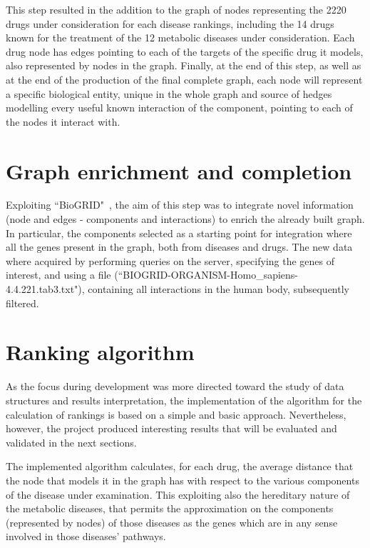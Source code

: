 This step resulted in the addition to the graph of nodes representing the 2220 drugs under consideration for each disease rankings, including the 14 drugs known for the treatment of the 12 metabolic diseases under consideration.
Each drug node has edges pointing to each of the targets of the specific drug it models, also represented by nodes in the graph. Finally, at the end of this step, as well as at the end of the production of the final complete graph, each node will represent a specific biological entity, unique in the whole graph and source of hedges modelling every useful known interaction of the component, pointing to each of the nodes it interact with.

\section{Graph enrichment and completion}
Exploiting ``BioGRID"~\cite{biogrid}, the aim of this step was to integrate novel information (node and edges - components and interactions) to enrich the already built graph. In particular, the components selected as a starting point for integration where all the genes present in the graph, both from diseases and drugs. The new data where acquired by performing queries on the server, specifying the genes of interest, and using a  file (``BIOGRID-ORGANISM-Homo\_sapiens-4.4.221.tab3.txt"), containing all interactions in the human body, subsequently filtered. 

\section{Ranking algorithm}

As the focus during development was more directed toward the study of data structures and results interpretation, the implementation of the algorithm for the calculation of rankings is based on a simple and basic approach. Nevertheless, however, the project produced interesting results that will be evaluated and validated in the next sections. 

The implemented algorithm calculates, for each drug, the average distance that the node that models it in the graph has with respect to the various components of the disease under examination. This exploiting also the hereditary nature of the metabolic diseases, that permits the approximation on the components (represented by nodes) of those diseases as the genes which are in any sense involved in those diseases' pathways.

